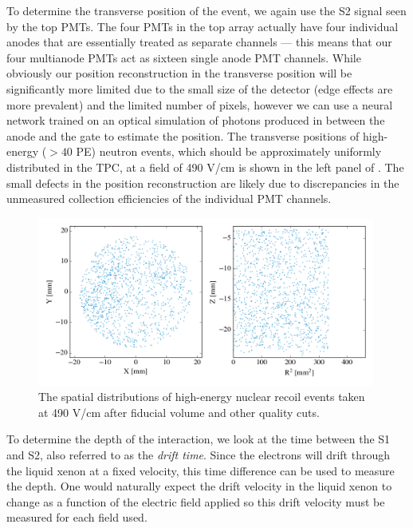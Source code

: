 To determine the transverse position of the event, we again use the S2 signal seen by the top PMTs.  The four PMTs in the top array actually have four individual anodes that are essentially treated as separate channels --- this means that our four multianode PMTs act as sixteen single anode PMT channels.  While obviously our position reconstruction in the transverse position will be significantly more limited due to the small size of the detector (edge effects are more prevalent) and the limited number of pixels, however we can use a neural network trained on an optical simulation of photons produced in between the anode and the gate to estimate the position.  The transverse positions of high-energy ($>40$ PE) neutron events, which should be approximately uniformly distributed in the TPC, at a field of 490 V/cm is shown in the left panel of .  The small defects in the position reconstruction are likely due to discrepancies in the unmeasured collection efficiencies of the individual PMT channels.

\begin{figure}[t]
        \centering
	\includegraphics[width=0.99\textwidth]{nerix_position_reconstruction}
	\caption{The spatial distributions of high-energy nuclear recoil events taken at 490 V/cm after fiducial volume and other quality cuts.}
	\label{fig:nerix_position_reconstruction}
\end{figure}

To determine the depth of the interaction, we look at the time between the S1 and S2, also referred to as the \textit{drift time}.  Since the electrons will drift through the liquid xenon at a fixed velocity, this time difference can be used to measure the depth.  One would naturally expect the drift velocity in the liquid xenon to change as a function of the electric field applied so this drift velocity must be measured for each field used.

